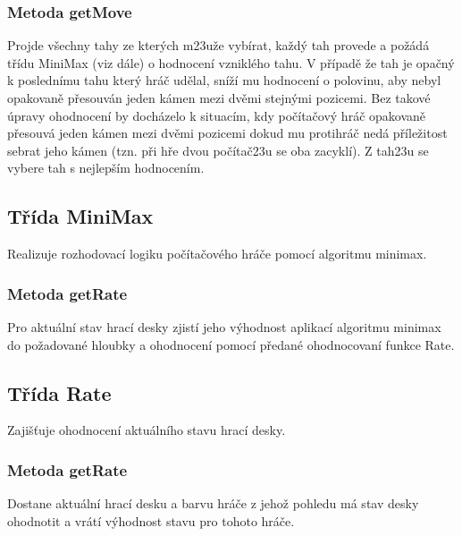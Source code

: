 \documentclass{article}
\begin{document}
\subsubsection{Metoda getMove}
Projde v\v{s}echny tahy ze kter\'ych m\accent23u\v{z}e vyb\'irat, ka\v{z}d\'y tah provede a po\v{z}\'ad\'a t\v{r}\'idu MiniMax (viz d\'ale) o hodnocen\'i vznikl\'eho tahu. V p\v{r}\'ipad\v{e} \v{z}e tah je opa\v{c}n\'y k posledn\'imu tahu kter\'y hr\'a\v{c} ud\v{e}lal, sn\'i\v{z}\'i mu hodnocen\'i o polovinu, aby nebyl opakovan\v{e} p\v{r}esouv\'an jeden k\'amen mezi dv\v{e}mi stejn\'ymi pozicemi. Bez takov\'e \'upravy ohodnocen\'i by doch\'azelo k situac\'im, kdy po\v{c}\'ita\v{c}ov\'y hr\'a\v{c} opakovan\v{e} p\v{r}esouv\'a jeden k\'amen mezi dv\v{e}mi pozicemi dokud mu protihr\'a\v{c} ned\'a p\v{r}\'ile\v{z}itost sebrat jeho k\'amen (tzn. p\v{r}i h\v{r}e dvou po\v{c}\'ita\v{c}\accent23u se oba zacykl\'i). Z tah\accent23u se vybere tah s nejlep\v{s}\'im hodnocen\'im.



\subsection{T\v{r}\'ida MiniMax}
Realizuje rozhodovac\'i logiku po\v{c}\'ita\v{c}ov\'eho hr\'a\v{c}e pomoc\'i algoritmu minimax.

\subsubsection{Metoda getRate}
Pro aktu\'aln\'i stav hrac\'i desky zjist\'i jeho v\'yhodnost aplikac\'i algoritmu minimax do po\v{z}adovan\'e hloubky a ohodnocen\'i pomoc\'i p\v{r}edan\'e ohodnocovan\'i funkce Rate.



\subsection{T\v{r}\'ida Rate}
Zaji\v{s}\v{t}uje ohodnocen\'i aktu\'aln\'iho stavu hrac\'i desky.

\subsubsection{Metoda getRate}
Dostane aktu\'aln\'i hrac\'i desku a barvu hr\'a\v{c}e z jeho\v{z} pohledu m\'a stav desky ohodnotit a vr\'at\'i v\'yhodnost stavu pro tohoto hr\'a\v{c}e.\medskip
\end{document}
